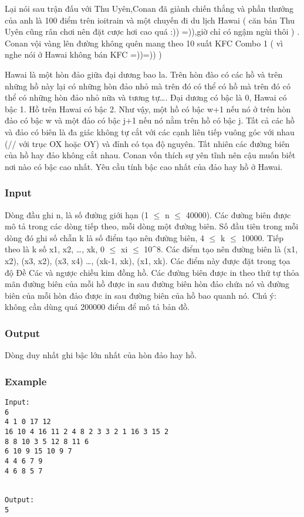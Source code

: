 



   Lại nói sau trận đấu với Thu Uyên,Conan đã giành chiến thắng và phần thưởng của anh là 100 điểm trên ioitrain và một chuyến đi du lịch Hawai ( căn bản Thu Uyên cũng rân chơi nên đặt cược hơi cao quá :)) =)),giờ chỉ có ngậm ngùi thôi ) . Conan vội vàng lên đường không quên mang theo 10 suất KFC Combo 1 ( vì nghe nói ở Hawai không bán KFC =))=)) )  

   Hawai là một hòn đảo giữa đại dương bao la. Trên hòn đào có các hồ và trên những hồ này lại có những hòn đảo nhỏ mà trên đó có thể có hồ mà trên đó có thể có những hòn đảo nhỏ nữa và tương tự…. Đại dương có bậc là 0, Hawai có bậc 1. Hồ trên Hawai có bậc 2. Như vậy, một hồ có bậc w+1 nếu nó ở trên hòn đảo có bậc w và một đảo có bậc j+1 nếu nó nằm trên hồ có bậc j. Tất cả các hồ và đảo có biên là đa giác không tự cắt với các cạnh liên tiếp vuông góc với nhau (// với trục OX hoặc OY) và đỉnh có tọa độ nguyên. Tất nhiên các đường biên của hồ hay đảo không cắt nhau. Conan vốn thích sự yên tĩnh nên cậu muốn biết nơi nào có bậc cao nhất. Yêu cầu tính bậc cao nhất của đảo hay hồ ở Hawai.  

\subsubsection{   Input  }  Dòng đầu ghi n, là số đường giới hạn (1  $\le$  n  $\le$  40000).  Các đường biên được mô tả trong các dòng tiếp theo, mỗi dòng một đường biên. Số đầu tiên trong mỗi dòng đó ghi số chẵn k là số điểm tạo nên đường biên, 4  $\le$  k  $\le$  10000. Tiếp theo là k số x1, x2, …, xk, 0  $\le$  xi  $\le$  10\textasciicircum8. Các điểm tạo nên đường biên là (x1, x2), (x3, x2), (x3, x4) …, (xk-1, xk), (x1, xk). Các điểm này được đặt trong tọa độ Đề Các và ngược chiều kim đồng hồ. Các đường biên được in theo thứ tự thỏa mãn đường biên của mỗi hồ được in sau đường biên hòn đảo chứa nó và đường biên của mỗi hòn đảo được in sau đường biên của hồ bao quanh nó. Chú ý: không cần dùng quá 200000 điểm để mô tả bản đồ.  

\subsubsection{   Output  }  Dòng duy nhất ghi bậc lớn nhất của hòn đảo hay hồ.  

\subsubsection{   Example  }
\begin{verbatim}
Input:
6
4 1 0 17 12
16 10 4 16 11 2 4 8 2 3 3 2 1 16 3 15 2
8 8 10 3 5 12 8 11 6
6 10 9 15 10 9 7
4 4 6 7 9
4 6 8 5 7


Output:
5
\end{verbatim}
